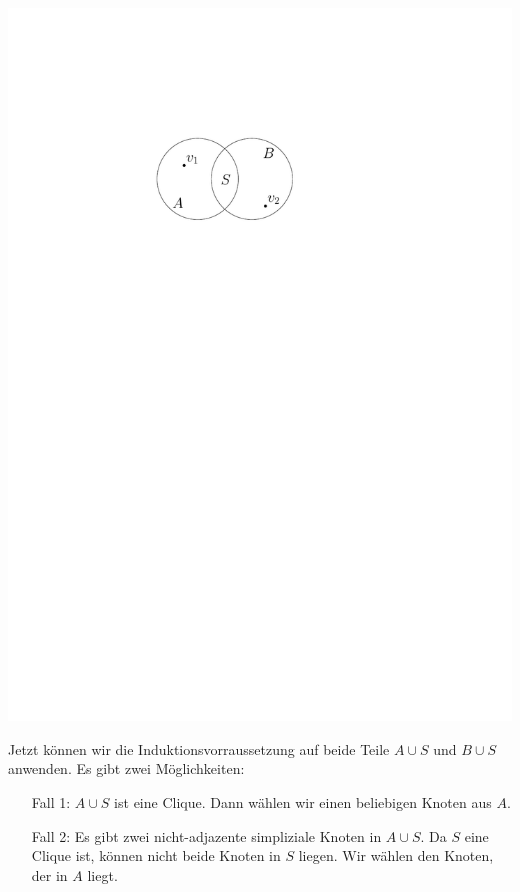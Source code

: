 \begin{center}
    \vspace{1ex}
    \includegraphics[page=1]{fig/03-2b-sep}
\end{center}

Jetzt können wir die Induktionsvorraussetzung auf beide Teile $A \cup S$ und $B \cup S$ anwenden.
Es gibt zwei Möglichkeiten:

\begin{itemize}
	\item [Fall 1:] $A \cup S$ ist eine Clique. Dann wählen wir einen beliebigen Knoten aus $A$.
	\item [Fall 2:] Es gibt zwei nicht-adjazente simpliziale Knoten in $A \cup S$. Da $S$ eine Clique ist, können nicht beide Knoten in $S$ liegen. Wir wählen den Knoten, der in $A$ liegt.
\end{itemize}

